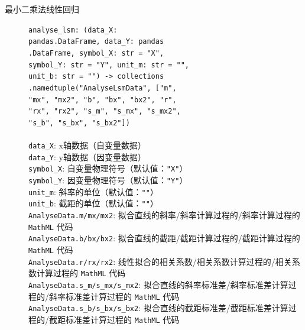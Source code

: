 \begin{description}
  \item[最小二乘法线性回归] \verb|analyse_lsm: (data_X:|\\\verb|pandas.DataFrame, data_Y: pandas|\\\verb|.DataFrame, symbol_X: str = "X",|\\\verb|symbol_Y: str = "Y", unit_m: str = "",|\\\verb|unit_b: str = "") -> collections|\\\verb|.namedtuple("AnalyseLsmData", ["m",|\\\verb|"mx", "mx2", "b", "bx", "bx2", "r",|\\\verb|"rx", "rx2", "s_m", "s_mx", "s_mx2",|\\\verb|"s_b", "s_bx", "s_bx2"])|\\
  \\
  \verb|data_X|: x轴数据（自变量数据）\\
  \verb|data_Y|: y轴数据（因变量数据）\\
  \verb|symbol_X|: 自变量物理符号（默认值：\verb|"X"|）\\
  \verb|symbol_Y|: 因变量物理符号（默认值：\verb|"Y"|）\\
  \verb|unit_m|: 斜率的单位（默认值：\verb|""|）\\
  \verb|unit_b|: 截距的单位（默认值：\verb|""|）\\
  \verb|AnalyseData.m/mx/mx2|: 拟合直线的斜率/斜率计算过程的/斜率计算过程的 \verb|MathML| 代码\\
  \verb|AnalyseData.b/bx/bx2|: 拟合直线的截距/截距计算过程的/截距计算过程的 \verb|MathML| 代码\\
  \verb|AnalyseData.r/rx/rx2|: 线性拟合的相关系数/相关系数计算过程的/相关系数计算过程的 \verb|MathML| 代码\\
  \verb|AnalyseData.s_m/s_mx/s_mx2|: 拟合直线的斜率标准差/斜率标准差计算过程的/斜率标准差计算过程的 \verb|MathML| 代码\\
  \verb|AnalyseData.s_b/s_bx/s_bx2|: 拟合直线的截距标准差/截距标准差计算过程的/截距标准差计算过程的 \verb|MathML| 代码
\end{description}